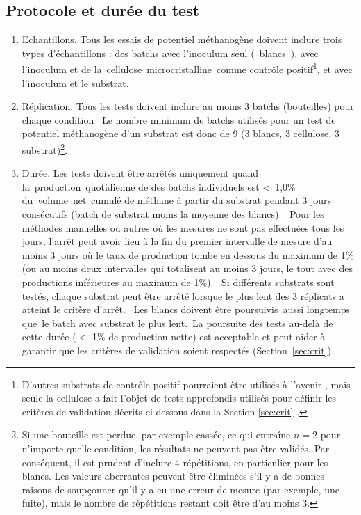 \documentclass[]{article}
\begin{document}
\subsection{Protocole et durée du test}
\label{sec:setup}
\begin{enumerate}
  \item Echantillons. 
    Tous les essais de potentiel méthanogène doivent inclure trois types d’échantillons : des batchs avec l’inoculum seul (\guillemotleft~blancs~\guillemotright), avec l’inoculum et de la cellulose microcristalline comme contrôle positif\footnote{D'autres substrats de contrôle positif pourraient être utilisés à l'avenir \citep{kochEvaluationCommonSupermarket2020}, mais seule la cellulose a fait l'objet de tests approfondis utilisés pour définir les critères de validation décrits ci-dessous dans la Section \ref{sec:crit} \citep{hafnerImprovingInterlaboratoryReproducibility2020}.
    }, et avec l’inoculum et le substrat.
    \item Réplication. 
Tous les tests doivent inclure au moins 3 batchs (bouteilles) pour chaque condition 
    Le nombre minimum de batchs utilisés pour un test de potentiel méthanogène d’un substrat est donc de 9 (3 blancs, 3 cellulose, 3 substrat)\footnote{
      Si une bouteille est perdue, par exemple cassée, ce qui entraîne $ n = 2 $ pour n'importe quelle condition, les résultats ne peuvent pas être validés.
      Par conséquent, il est prudent d'inclure 4 répétitions, en particulier pour les blancs.
      Les valeurs aberrantes peuvent être éliminées s'il y a de bonnes raisons de soupçonner qu'il y a eu une erreur de mesure (par exemple, une fuite), mais le nombre de répétitions restant doit être d'au moins 3.
    }.
  \item Durée. 
    Les tests doivent être arrêtés uniquement quand la production quotidienne de  des batchs individuels est < 1,0\% du volume net cumulé de méthane à partir du substrat pendant 3 jours consécutifs (batch de substrat moins la moyenne des blancs).  
    Pour les méthodes manuelles ou autres où les mesures ne sont pas effectuées tous les jours, l’arrêt peut avoir lieu à la fin du premier intervalle de mesure d'au moins 3 jours où le taux de production tombe en dessous du maximum de 1\% (ou au moins deux intervalles qui totalisent au moins 3 jours, le tout avec des productions inférieures au maximum de 1\%). 
    Si différents substrats sont testés, chaque substrat peut être arrêté lorsque le plus lent des 3 réplicats a atteint le critère d’arrêt. 
    Les blancs doivent être poursuivis aussi longtemps que le batch avec substrat le plus lent. La poursuite des tests au-delà de cette durée ($<$ 1\% de production nette) est acceptable et peut aider à garantir que les critères de validation soient respectés (Section \ref{sec:crit}).
\end{enumerate}
\end{document}
